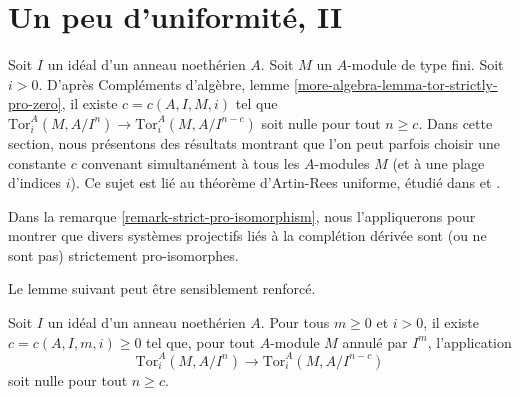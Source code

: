 \section{Un peu d'uniformité, II}
\label{section-uniform-vanishing-bis}

\noindent
Soit $I$ un idéal d'un anneau noethérien $A$. Soit $M$ un $A$-module de type fini. Soit $i > 0$. D'après Compléments d'algèbre, lemme \ref{more-algebra-lemma-tor-strictly-pro-zero}, il existe $c = c(A, I, M, i)$ tel que $\text{Tor}^A_i(M, A/I^n) \to \text{Tor}^A_i(M, A/I^{n - c})$ soit nulle pour tout $n \geq c$. Dans cette section, nous présentons des résultats montrant que l'on peut parfois choisir une constante $c$ convenant simultanément à tous les $A$-modules $M$ (et à une plage d'indices $i$). Ce sujet est lié au théorème d'Artin-Rees uniforme, étudié dans \cite{Huneke-uniform} et \cite{AHS}.

\medskip\noindent
Dans la remarque \ref{remark-strict-pro-isomorphism}, nous l'appliquerons pour montrer que divers systèmes projectifs liés à la complétion dérivée sont (ou ne sont pas) strictement pro-isomorphes.

\medskip\noindent
Le lemme suivant peut être sensiblement renforcé.

\begin{lemma}
\label{lemma-maps-zero-fixed-torsion}
Soit $I$ un idéal d'un anneau noethérien $A$. Pour tous $m \geq 0$ et $i > 0$, il existe $c = c(A, I, m, i) \geq 0$ tel que, pour tout $A$-module $M$ annulé par $I^m$, l'application
$$
\text{Tor}^A_i(M, A/I^n) \to \text{Tor}^A_i(M, A/I^{n - c})
$$
soit nulle pour tout $n \geq c$.
\end{lemma}

